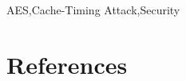 \documentclass[3p]{elsarticle}
\begin{document}
\begin{frontmatter}
\begin{keyword}
AES\sep Cache-Timing Attack\sep Security
\end{keyword}

\end{frontmatter}

\linenumbers


\clearpage

\section*{References}


\end{document}
